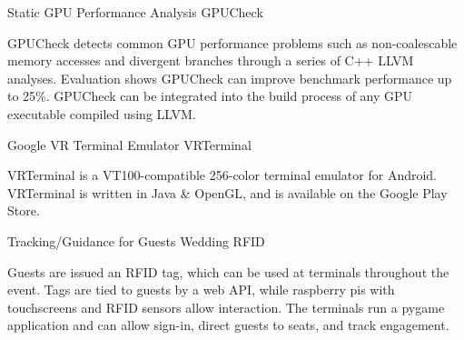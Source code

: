 
\begin{cventries}
    \cventry
        {Static GPU Performance Analysis} %
        {GPUCheck} %
        {} %
        {} %
        {
            \parbox[t]{8.5cm}{GPUCheck detects common GPU performance problems such as non-coalescable memory accesses and divergent branches through a series of C++ LLVM analyses.
            Evaluation shows GPUCheck can improve benchmark performance up to 25\%.
            GPUCheck can be integrated into the build process of any GPU executable compiled using LLVM.
        }}
    \vspace{4mm}
    \cventry
        {Google VR Terminal Emulator} %
        {VRTerminal} %
        {} %
        {} %
        {\parbox[t]{8.5cm}{
            VRTerminal is a VT100-compatible 256-color terminal emulator for Android.
            VRTerminal is written in Java \& OpenGL, and is available on the Google Play Store.
        }}
    \vspace{4mm}
    \cventry
        {Tracking/Guidance for Guests} %
        {Wedding RFID} %
        {} %
        {} %
        {\parbox[t]{8.5cm}{
            Guests are issued an RFID tag, which can be used at terminals throughout the event.
            Tags are tied to guests by a web API, while raspberry pis with touchscreens and RFID sensors allow interaction.
            The terminals run a pygame application and can allow sign-in, direct guests to seats, and track engagement.
        }}
\end{cventries}
